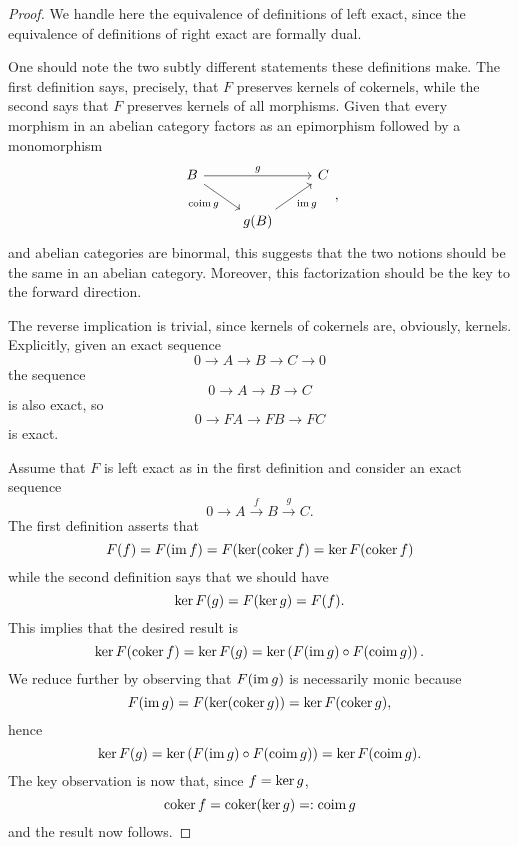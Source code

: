 \documentclass[reqno, 12pt]{amsart}
\begin{document}
\begin{proof}
  We handle here the equivalence of definitions of left exact, since the equivalence of definitions of right exact are formally dual.

  One should note the two subtly different statements these definitions make.
  The first definition says, precisely, that $F$ preserves kernels of cokernels, while the second says that $F$ preserves kernels of all morphisms.
  Given that every morphism in an abelian category factors as an epimorphism followed by a monomorphism
  $$\begin{tikzcd}
    B \arrow{rr}{g}\arrow[swap]{rd}{\op{coim} g} && C\\
    & g(B) \arrow[swap]{ur}{\op{im} g}
  \end{tikzcd},$$
  and abelian categories are binormal, this suggests that the two notions should be the same in an abelian category.
  Moreover, this factorization should be the key to the forward direction.

  The reverse implication is trivial, since kernels of cokernels are, obviously, kernels.
  Explicitly, given an exact sequence
  $$0 \to A \to B \to C \to 0$$
  the sequence
  $$0 \to A \to B \to C$$
  is also exact, so
  $$0 \to FA \to FB \to FC$$
  is exact.
  
  Assume that $F$ is left exact as in the first definition and consider an exact sequence
  $$0 \to A \overset{f}\to B \overset{g}\to C.$$
  The first definition asserts that
  $$F(f) = F(\operatorname{im}f) = F(\operatorname{ker}(\operatorname{coker}f) = \operatorname{ker}F(\operatorname{coker}f)$$
  while the second definition says that we should have
  $$\operatorname{ker}F(g) = F(\operatorname{ker}g) = F(f).$$
  This implies that the desired result is
  $$\operatorname{ker} F(\operatorname{coker} f) = \operatorname{ker} F(g) = \operatorname{ker}\left( F(\operatorname{im}g) \circ F(\operatorname{coim} g)\right).$$
  We reduce further by observing that $F(\operatorname{im}g)$ is necessarily monic because
  $$F(\operatorname{im}g) = F(\operatorname{ker}(\operatorname{coker}g)) = \operatorname{ker}F(\operatorname{coker} g),$$
  hence
  $$\operatorname{ker} F(g) = \operatorname{ker}\left( F(\operatorname{im}g) \circ F(\operatorname{coim} g)\right) = \operatorname{ker} F(\operatorname{coim} g).$$
  The key observation is now that, since $f = \operatorname{ker} g$,
  $$\operatorname{coker}f = \operatorname{coker}(\operatorname{ker}g) =: \operatorname{coim}g$$
  and the result now follows.
\end{proof}
\end{document}
